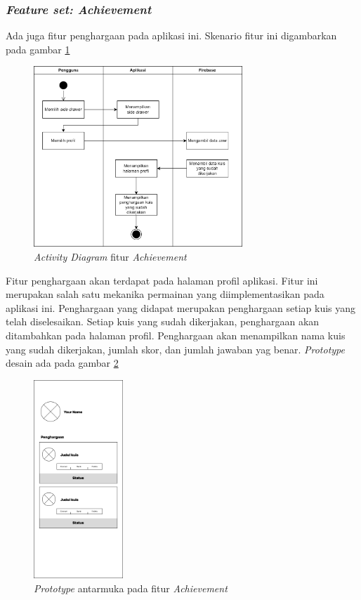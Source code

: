 \subsubsection{\textit{Feature set: Achievement}}

Ada juga fitur penghargaan pada aplikasi ini. Skenario fitur ini digambarkan pada gambar \ref*{Fig:ActivityProfiil}
\begin{figure}[H]
	\centering
	\includegraphics[width=0.7\textwidth]{contents/chapter-3/images/AD-profil.png}
	\caption{\textit{Activity Diagram} fitur \textit{Achievement}}
	\label{Fig:ActivityProfiil}
\end{figure}
Fitur penghargaan akan terdapat pada halaman profil aplikasi.
Fitur ini merupakan salah satu mekanika permainan yang diimplementasikan pada aplikasi ini.
Penghargaan yang didapat merupakan penghargaan setiap kuis yang telah diselesaikan.
Setiap kuis yang sudah dikerjakan, penghargaan akan ditambahkan pada halaman profil.
Penghargaan akan menampilkan nama kuis yang sudah dikerjakan, jumlah skor, dan jumlah jawaban yag benar.
\textit{Prototype} desain ada pada gambar \ref*{Fig:ActivityProfil2}
\begin{figure}[H]
	\centering
	\includegraphics[width=0.3\textwidth]{contents/chapter-3/images/MF-Profil.png}
	\caption{\textit{Prototype} antarmuka pada fitur \textit{Achievement}}
	\label{Fig:ActivityProfil2}
\end{figure}
